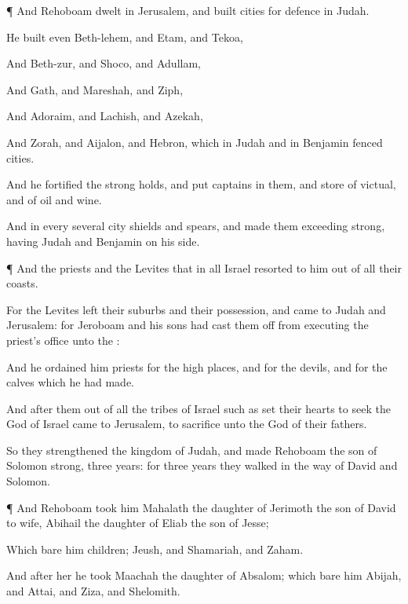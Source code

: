 {\par }{\PP {}¶ And
Rehoboam
dwelt in
Jerusalem, and
built
cities for
defence in
Judah.

He
built even
Beth-lehem, and
Etam, and
Tekoa,

And
Beth-zur, and
Shoco, and
Adullam,

And
Gath, and
Mareshah, and
Ziph,

And
Adoraim, and
Lachish, and
Azekah,

And
Zorah, and
Aijalon, and
Hebron, which
{} in
Judah and in
Benjamin
fenced
cities.

And he
fortified the strong
holds, and
put
captains in them, and
store of
victual, and of
oil and
wine.

And in every several
city
{}
shields and
spears, and made them
exceeding
strong, having
Judah and
Benjamin on his side.


\par }{\PP {}¶ And the
priests and the
Levites that
{} in all
Israel
resorted to him out of all their
coasts.

For the
Levites
left their
suburbs and their
possession, and
came to
Judah and
Jerusalem: for
Jeroboam and his
sons had cast them
off from executing the
priest’s office unto the
{}:

And he
ordained him
priests for the high
places, and for the
devils, and for the
calves which he had
made.

And
after them out of all the
tribes of
Israel such as
set their
hearts to
seek the
{}
God of
Israel
came to
Jerusalem, to
sacrifice unto the
{}
God of their
fathers.

So they
strengthened the
kingdom of
Judah, and made
Rehoboam the
son of
Solomon
strong,
three
years: for
three
years they
walked in the
way of
David and
Solomon.


\par }{\PP {}¶ And
Rehoboam
took him
Mahalath the
daughter of
Jerimoth the
son of
David to
wife,
{}
Abihail the
daughter of
Eliab the
son of
Jesse;

Which
bare him
children;
Jeush, and
Shamariah, and
Zaham.

And
after her he
took
Maachah the
daughter of
Absalom; which
bare him
Abijah, and
Attai, and
Ziza, and
Shelomith.

}
